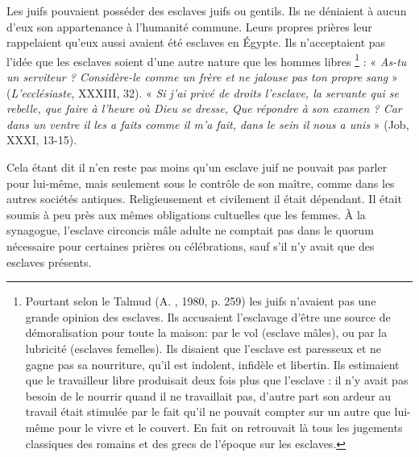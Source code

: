  Les juifs pouvaient posséder des esclaves juifs ou gentils. Ils ne déniaient à aucun d'eux son appartenance à l'humanité commune. Leurs propres prières leur rappelaient qu'eux aussi avaient été esclaves en Égypte. Ils n'acceptaient pas l'idée que les esclaves soient d'une autre nature que les hommes libres%
\footnote{Pourtant selon le Talmud (A. , 1980, p. 259) les juifs n'avaient pas une grande opinion des esclaves. Ils accusaient l'esclavage d'être une source de démoralisation pour toute la maison: par le vol (esclave mâles), ou par la lubricité (esclaves femelles). Ils disaient que l'esclave est paresseux et ne gagne pas sa nourriture, qu'il est indolent, infidèle et libertin. Ils estimaient que le travailleur libre produisait deux fois plus que l'esclave : il n'y avait pas besoin de le nourrir quand il ne travaillait pas, d'autre part son ardeur au travail était stimulée par le fait qu'il ne pouvait compter sur un autre que lui-même pour le vivre et le couvert. En fait on retrouvait là tous les jugements classiques des romains et des grecs de l'époque sur les esclaves.}%
 : « \emph{As-tu un serviteur ? Considère-le comme un frère et ne jalouse pas ton propre sang} » (\emph{L'ecclésiaste}, XXXIII, 32). « \emph{Si j'ai privé de droits l'esclave, la servante qui se rebelle, que faire à l'heure où Dieu se dresse, Que répondre à son examen ? Car dans un ventre il les a faits comme il m'a fait, dans le sein il nous a unis} » (Job, XXXI, 13-15). 

 Cela étant dit il n'en reste pas moins qu'un esclave juif ne pouvait pas parler pour lui-même, mais seulement sous le contrôle de son maître, comme dans les autres sociétés antiques. Religieusement et civilement il était dépendant. Il était soumis à peu près aux mêmes obligations cultuelles que les femmes. À la synagogue, l'esclave circoncis mâle adulte ne comptait pas dans le quorum nécessaire pour certaines prières ou célébrations, sauf s'il n'y avait que des esclaves présents.

